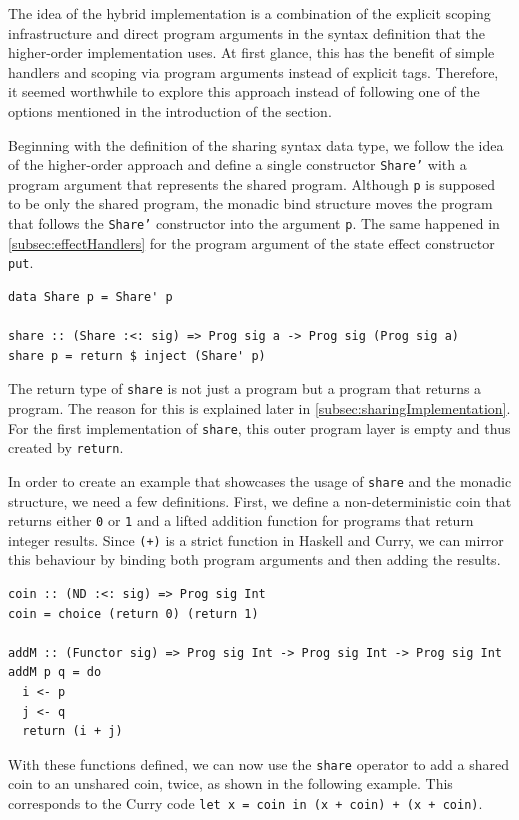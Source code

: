 \documentclass[a4paper, 11pt, fleqn, twoside, abstract=on]{scrreprt}
\newcommand{\hinl}[1]{\texttt{#1}}
\begin{document}
The idea of the hybrid implementation is a combination of the explicit scoping infrastructure and direct program arguments in the syntax definition that the higher-order implementation uses.
At first glance, this has the benefit of simple handlers and scoping via program arguments instead of explicit tags.
Therefore, it seemed worthwhile to explore this approach instead of following one of the options mentioned in the introduction of the section.

Beginning with the definition of the sharing syntax data type, we follow the idea of the higher-order approach and define a single constructor \hinl{Share'} with a program argument that represents the shared program.
Although \hinl{p} is supposed to be only the shared program, the monadic bind structure moves the program that follows the \hinl{Share'} constructor into the argument \hinl{p}.
The same happened in \autoref{subsec:effectHandlers} for the program argument of the state effect constructor \hinl{put}.

\begin{verbatim}
data Share p = Share' p

share :: (Share :<: sig) => Prog sig a -> Prog sig (Prog sig a)
share p = return $ inject (Share' p)
\end{verbatim}

The return type of \hinl{share} is not just a program but a program that returns a program.
The reason for this is explained later in \autoref{subsec:sharingImplementation}.
For the first implementation of \hinl{share}, this outer program layer is empty and thus created by \hinl{return}.

In order to create an example that showcases the usage of \hinl{share} and the monadic structure, we need a few definitions.
First, we define a non-deterministic coin that returns either \hinl{0} or \hinl{1} and a lifted addition function for programs that return integer results.
Since \hinl{(+)} is a strict function in Haskell and Curry, we can mirror this behaviour by binding both program arguments and then adding the results.

\begin{verbatim}
coin :: (ND :<: sig) => Prog sig Int
coin = choice (return 0) (return 1)

addM :: (Functor sig) => Prog sig Int -> Prog sig Int -> Prog sig Int
addM p q = do
  i <- p 
  j <- q 
  return (i + j)
\end{verbatim}

With these functions defined, we can now use the \hinl{share} operator to add a shared coin to an unshared coin, twice, as shown in the following example.
This corresponds to the Curry code \hinl{let x = coin in (x + coin) + (x + coin)}.
\end{document}
